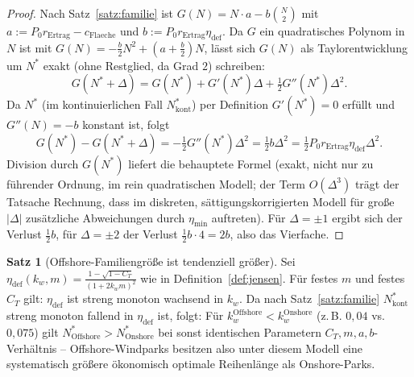 ﻿\documentclass[a4paper,12pt]{article}
\theoremstyle{definition}
\newtheorem{satz}{Satz}
\begin{document}
\begin{proof}
Nach Satz~\ref{satz:familie} ist $G(N) = N\cdot a - b\binom{N}{2}$ mit $a:=P_0 r_{\mathrm{Ertrag}}-c_{\mathrm{Flaeche}}$ und $b:=P_0 r_{\mathrm{Ertrag}}\eta_{\mathrm{def}}$. Da $G$ ein quadratisches Polynom in $N$ ist mit $G(N)=-\tfrac{b}{2}N^2+(a+\tfrac{b}{2})N$, lässt sich $G(N)$ als Taylorentwicklung um $N^*$ exakt (ohne Restglied, da Grad $2$) schreiben:
\[
G(N^*+\Delta) = G(N^*) + G'(N^*)\Delta + \tfrac{1}{2}G''(N^*)\Delta^2.
\]
Da $N^*$ (im kontinuierlichen Fall $N_{\mathrm{kont}}^*$) per Definition $G'(N^*)=0$ erfüllt und $G''(N)=-b$ konstant ist, folgt
\[
G(N^*)-G(N^*+\Delta) = -\tfrac{1}{2}G''(N^*)\Delta^2 = \tfrac{1}{2}b\Delta^2 = \tfrac{1}{2}P_0 r_{\mathrm{Ertrag}}\eta_{\mathrm{def}}\Delta^2.
\]
Division durch $G(N^*)$ liefert die behauptete Formel (exakt, nicht nur zu führender Ordnung, im rein quadratischen Modell; der Term $O(\Delta^3)$ trägt der Tatsache Rechnung, dass im diskreten, sättigungskorrigierten Modell für große $|\Delta|$ zusätzliche Abweichungen durch $\eta_{\min}$ auftreten). Für $\Delta=\pm1$ ergibt sich der Verlust $\tfrac{1}{2}b$, für $\Delta=\pm2$ der Verlust $\tfrac{1}{2}b\cdot4=2b$, also das Vierfache. \qedhere
\end{proof}

\begin{satz}[Offshore-Familiengröße ist tendenziell größer]
\label{satz:offshore_familie}
Sei $\eta_{\mathrm{def}}(k_w,m) = \frac{1-\sqrt{1-C_T}}{(1+2k_wm)^2}$ wie in Definition~\ref{def:jensen}. Für festes $m$ und festes $C_T$ gilt: $\eta_{\mathrm{def}}$ ist streng monoton wachsend in $k_w$. Da nach Satz~\ref{satz:familie} $N^*_{\mathrm{kont}}$ streng monoton fallend in $\eta_{\mathrm{def}}$ ist, folgt: Für $k_w^{\mathrm{Offshore}}<k_w^{\mathrm{Onshore}}$ (z.\,B. $0{,}04$ vs. $0{,}075$) gilt $N^{*}_{\mathrm{Offshore}} > N^{*}_{\mathrm{Onshore}}$ bei sonst identischen Parametern $C_T, m, a, b$-Verhältnis -- Offshore-Windparks besitzen also unter diesem Modell eine systematisch größere ökonomisch optimale Reihenlänge als Onshore-Parks.
\end{satz}
\end{document}

